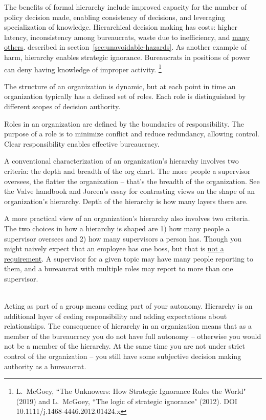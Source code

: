 The benefits of formal hierarchy include improved capacity for the number of policy decision made, enabling consistency of decisions, and leveraging specialization of knowledge. 
Hierarchical decision making has costs: higher latency, inconsistency among bureaucrats, waste due to inefficiency, and 
\hyperref[sec:unavoidable-hazards]{many others}.
\ifsectionref
described in section~\ref{sec:unavoidable-hazards}. 
\fi
As another example of harm, hierarchy enables strategic ignorance. Bureaucrats in positions of power can deny having knowledge of improper activity. 
\footnote{L.~McGoey, ``The Unknowers: How Strategic Ignorance Rules the World" (2019)
and 
L.~McGoey, ``The logic of strategic ignorance" (2012). DOI 
10.1111/j.1468-4446.2012.01424.x
}


The structure of an organization is dynamic, but at each point in time an organization typically has a defined set of roles. Each role is distinguished by different scopes of decision authority. 




Roles in an organization are defined by the boundaries of responsibility. The purpose of a role is to minimize conflict and reduce redundancy, allowing control. Clear responsibility enables effective bureaucracy. 


A conventional characterization of an organization's hierarchy involves two criteria: the depth and breadth of the org chart.
The more people a supervisor oversees, the flatter the organization -- that's the breadth of the organization. See the Valve handbook \cite{2012_Valve} and Joreen's essay \cite{1972_Joreen} for contrasting views on the shape of an organization's hierarchy. Depth of the hierarchy is how many layers there are.

A more practical view of an organization's hierarchy also involves two criteria. The two choices in how a hierarchy is shaped are 
1) how many people a supervisor oversees and 
2) how many supervisors a person has. 
Though you might naively expect that an employee has one boss, but that is \href{https://en.wikipedia.org/wiki/Matrix_management}{not a requirement}. A supervisor for a given topic may have many people reporting to them, and a bureaucrat with multiple roles may report to more than one supervisor.

\ \\

Acting as part of a group means ceding part of your autonomy. Hierarchy is an additional layer of ceding responsibility and adding expectations about relationships.
The consequence of hierarchy in an organization means that as a member of the bureaucracy you do not have full autonomy -- otherwise you would not be a member of the hierarchy. At the same time you are not under strict control of the organization -- you still have some subjective decision making authority as a bureaucrat.

